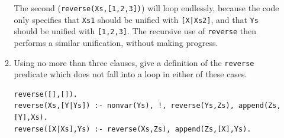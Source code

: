 \documentclass{article}
\begin{document}
\begin{enumerate}
\begin{enumerate}
The second (\verb!reverse(Xs,[1,2,3])!) will loop endlessly, because
the code only specifies that \verb!Xs1! should be unified with \verb![X|Xs2]!,
and that \verb!Ys! should be unified with \verb![1,2,3]!. The recursive
use of \verb!reverse! then performs a similar unification, without making
progress.
\item
Using no more than three clauses, give a definition of the
\verb!reverse! predicate which does not fall into a loop in either of
these cases.

\begin{verbatim}
reverse([],[]).
reverse(Xs,[Y|Ys]) :- nonvar(Ys), !, reverse(Ys,Zs), append(Zs,[Y],Xs).
reverse([X|Xs],Ys) :- reverse(Xs,Zs), append(Zs,[X],Ys).
\end{verbatim}

\end{enumerate}

\end{enumerate}
\end{document}
